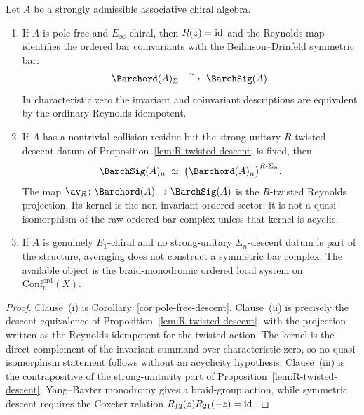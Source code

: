 \begin{proposition}
\ClaimStatusProvedHere
\label{prop:symmetric-descent}
Let $A$ be a strongly admissible associative chiral algebra.
\begin{enumerate}[label=\textup{(\roman*)}]
\item If $A$ is pole-free and $E_\infty$-chiral, then
$R(z)=\mathrm{id}$ and the Reynolds map identifies the ordered bar
coinvariants with the Beilinson--Drinfeld symmetric bar:
\[
 \Barchord(A)_{\Sigma}\;\xrightarrow{\;\sim\;}\;\BarchSig(A).
\]
In characteristic zero the invariant and coinvariant descriptions are
equivalent by the ordinary Reynolds idempotent.

\item If $A$ has a nontrivial collision residue but the
strong-unitary $R$-twisted descent datum of
Proposition~\textup{\ref{lem:R-twisted-descent}} is fixed, then
\[
 \BarchSig(A)_n
 \;\simeq\;
 \bigl(\Barchord(A)_n\bigr)^{R\text{-}\Sigma_n}.
\]
The map $\av_R\colon\Barchord(A)\to\BarchSig(A)$ is the
$R$-twisted Reynolds projection. Its kernel is the non-invariant
ordered sector; it is not a quasi-isomorphism of the raw ordered bar
complex unless that kernel is acyclic.

\item If $A$ is genuinely $E_1$-chiral and no strong-unitary
$\Sigma_n$-descent datum is part of the structure, averaging does not
construct a symmetric bar complex. The available object is the
braid-monodromic ordered local system on
$\mathrm{Conf}^{\mathrm{ord}}_n(X)$.
\end{enumerate}
\end{proposition}

\begin{proof}
Clause~\textup{(i)} is Corollary~\ref{cor:pole-free-descent}.
Clause~\textup{(ii)} is precisely the descent equivalence of
Proposition~\ref{lem:R-twisted-descent}, with the projection written
as the Reynolds idempotent for the twisted action. The kernel is the
direct complement of the invariant summand over characteristic zero,
so no quasi-isomorphism statement follows without an acyclicity
hypothesis. Clause~\textup{(iii)} is the contrapositive of the
strong-unitarity part of Proposition~\ref{lem:R-twisted-descent}:
Yang--Baxter monodromy gives a braid-group action, while symmetric
descent requires the Coxeter relation
$R_{12}(z)R_{21}(-z)=\mathrm{id}$.
\end{proof}

